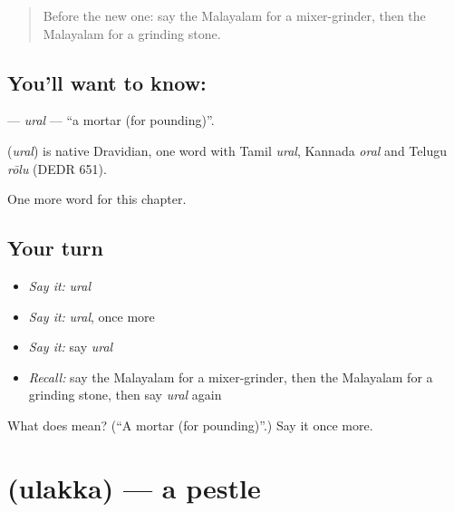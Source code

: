 \label{lesson:ML-C295-ural}



\begin{quote}
Before the new one: say the Malayalam for a mixer-grinder, then the Malayalam for a grinding stone.
\end{quote}

\subsection*{You'll want to know: }
\textbf{} — \emph{ural} — \textquotedblleft{}a mortar (for pounding)\textquotedblright{}.

\begin{cousinweb}
\textbf{} (\emph{ural}) is native Dravidian, one word with Tamil \emph{ural}, Kannada \emph{oral} and Telugu \emph{rōlu} (DEDR 651).
\end{cousinweb}

\begin{grammarlens}[title={What you've built}]
One more word for this chapter.
\end{grammarlens}

\subsection*{Your turn}
\begin{itemize}
\raggedright
  \item \emph{Say it:} \emph{ural}
  \item \emph{Say it:} \emph{ural}, once more
  \item \emph{Say it:} say \emph{ural}
  \item \emph{Recall:} say the Malayalam for a mixer-grinder, then the Malayalam for a grinding stone, then say \emph{ural} again
\end{itemize}

\begin{tcolorbox}[breakable,colback=teal!4,colframe=teal!35!black,title={Before you move on}]
What does  mean? (\textquotedblleft{}A mortar (for pounding)\textquotedblright{}.) Say it once more.
\end{tcolorbox}
\section[\texorpdfstring{\ml{ഉലക്ക} (ulakka)}{ഉലക്ക (ulakka)}]{ (ulakka) — a pestle}

\label{lesson:ML-C295-ulakka}



